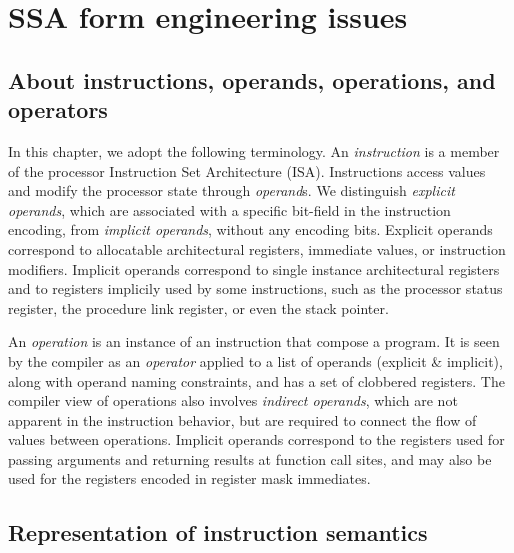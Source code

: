 \section{SSA form engineering issues}
\label{sec:ssa-codegen-engineering}

\subsection{About instructions, operands, operations, and operators}

In this chapter, we adopt the following terminology. An \emph{instruction} is a
member of the processor Instruction Set Architecture (ISA). Instructions access
values and modify the processor state through \emph{operand}s. We distinguish
\emph{explicit operands}, which are associated with a specific bit-field in the
instruction encoding, from \emph{implicit operands}, without any encoding bits.
Explicit operands correspond to allocatable architectural registers, immediate
values, or instruction modifiers. Implicit operands correspond to single
instance architectural registers and to registers implicily used by some
instructions, such as the processor status register, the procedure link
register, or even the stack pointer.

An \emph{operation} is an instance of an instruction that compose a program. It
is seen by the compiler as an \emph{operator} applied to a list of operands
(explicit \& implicit), along with operand naming constraints, and has a set of
clobbered registers. The compiler view of operations also involves
\emph{indirect operands}, which are not apparent in the instruction behavior,
but are required to connect the flow of values between operations.  Implicit
operands correspond to the registers used for passing arguments and returning
results at function call sites, and may also be used for the registers
encoded in register mask immediates.


\subsection{Representation of instruction semantics}

